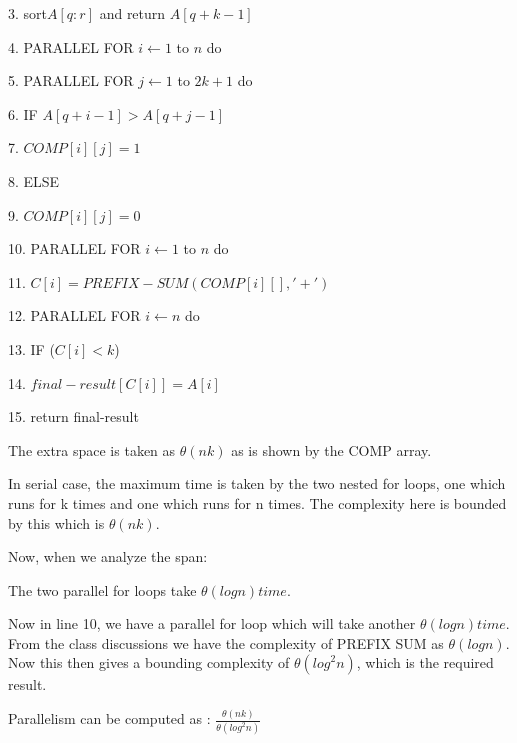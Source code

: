 \documentclass[11pt]{article}
\begin{document}
3. \quad sort$A[q:r]$ and return $A[q+k-1]$

4. PARALLEL FOR $i\leftarrow 1$ to $n$ do

5. \quad PARALLEL FOR $j\leftarrow 1$ to $2k+1$ do

6. \quad \quad IF $A[q+i-1]>A[q+j-1]$

7. \quad \quad \quad $COMP[i][j] = 1$

8. \quad \quad ELSE

9. \quad \quad \quad $COMP[i][j] = 0$

10. PARALLEL FOR $i\leftarrow 1$ to $n$ do

11. \quad $C[i] = PREFIX-SUM(COMP[i][],'+')$

12. PARALLEL FOR $i\leftarrow n$ do

13. \quad IF ($C[i] < k$) 

14. \quad \quad $final-result[C[i]] = A[i]$

15. return final-result


The extra space is taken as $\theta (nk)$ as is shown by the COMP array.

In serial case, the maximum time is taken by the two nested for loops, one which runs for k times and one which runs for n times. The complexity here is bounded by this which is $\theta(nk)$.

Now, when we analyze the span:

The two parallel for loops take $\theta(logn) time.$

Now in line 10, we have a parallel for loop which will take another $\theta(logn) time$. From the class discussions we have the complexity of PREFIX SUM as $\theta(logn)$. Now this then gives a bounding complexity of $\theta({log}^2 n)$, which is the required result.

Parallelism can be computed as : $\frac{\theta(nk)}{\theta(log^2 n)}$
\end{document}
